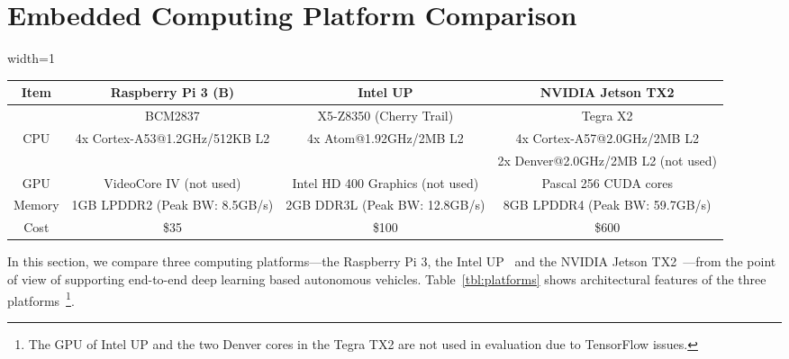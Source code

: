 
%

\section{Embedded Computing Platform Comparison}\label{sec:comparison}



\begin{table*}[h]
  \centering
  \begin{adjustbox}{width=1\textwidth}
  \begin{tabular}{|c|c|c|c|}
    \hline
    Item    & Raspberry Pi 3 (B)   & Intel UP                  & NVIDIA Jetson TX2\\
    \hline
            & BCM2837              & X5-Z8350 (Cherry Trail)   & Tegra X2 \\
    CPU     & 4x Cortex-A53@1.2GHz/512KB L2  &
              4x Atom@1.92GHz/2MB L2 &
              4x Cortex-A57@2.0GHz/2MB L2 \\
            &              &              & 2x Denver@2.0GHz/2MB L2 (not used)  \\
    \hline
    GPU     &  VideoCore IV (not used)    &
               Intel HD 400 Graphics (not used) &
               Pascal 256 CUDA cores   \\
    \hline
    Memory  & 1GB LPDDR2 (Peak BW: 8.5GB/s)  &  2GB DDR3L (Peak BW: 12.8GB/s)    & 8GB LPDDR4  (Peak BW: 59.7GB/s)            \\
	\hline
	Cost  & \$35 & \$100 & \$600 \\
	\hline
  \end{tabular}
  \end{adjustbox}
  \caption{Compared embedded computing platforms}
  \label{tbl:platforms}
\end{table*}

In this section, we compare three computing platforms---the Raspberry
Pi 3, the Intel UP~\cite{intelup} and the NVIDIA Jetson
TX2~\cite{nvidiajetson}---from the point of view of supporting
end-to-end deep learning based autonomous vehicles. 
Table~\ref{tbl:platforms} shows architectural features of the three
platforms~\footnote{The GPU of Intel UP and the two Denver cores in the
  Tegra TX2 are not used in evaluation due to TensorFlow issues.}.
  
